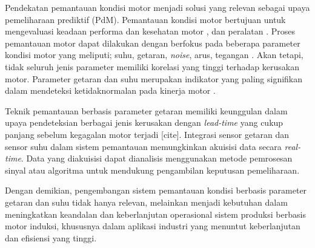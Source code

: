 \documentclass{elsinta}
\begin{document}
Pendekatan pemantauan kondisi motor menjadi solusi yang relevan sebagai upaya pemeliharaan prediktif (PdM). Pemantauan kondisi motor bertujuan untuk mengevaluasi keadaan performa dan kesehatan motor \cite{1.1.5}, dan peralatan \cite{1.1.6}. Proses pemantauan motor dapat dilakukan dengan berfokus pada beberapa parameter kondisi motor yang meliputi; suhu, getaran, \textit{noise}, arus, tegangan \cite{1.1.1}. Akan tetapi, tidak seluruh jenis parameter memiliki korelasi yang tinggi terhadap kerusakan motor. Parameter getaran dan suhu merupakan indikator yang paling signifikan dalam mendeteksi ketidaknormalan pada kinerja motor \cite{1.1.12}.

Teknik pemantauan berbasis parameter getaran memiliki keunggulan dalam upaya pendeteksian berbagai jenis kerusakan dengan \textit{lead-time} yang cukup panjang sebelum kegagalan motor terjadi [cite]. Integrasi sensor getaran dan sensor suhu dalam sistem pemantauan memungkinkan akuisisi data secara \textit{real-time}. Data yang diakuisisi dapat dianalisis menggunakan metode pemrosesan sinyal atau algoritma untuk mendukung pengambilan keputusan pemeliharaan.

Dengan demikian, pengembangan sistem pemantauan kondisi berbasis parameter getaran dan suhu tidak hanya relevan, melainkan menjadi kebutuhan dalam meningkatkan keandalan dan keberlanjutan operasional sistem produksi berbasis motor induksi, khususnya dalam aplikasi industri yang menuntut keberlanjutan dan efisiensi yang tinggi.

\end{document}
